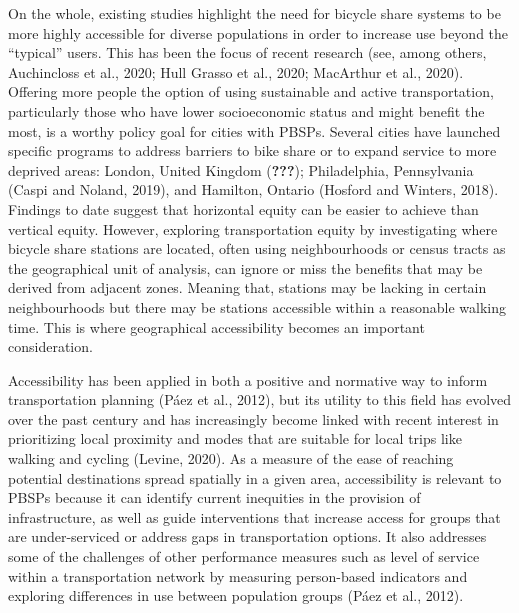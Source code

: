 \documentclass[]{elsarticle} %
\begin{document}
On the whole, existing studies highlight the need for bicycle share
systems to be more highly accessible for diverse populations in order to
increase use beyond the ``typical'' users. This has been the focus of
recent research (see, among others, Auchincloss et al., 2020; Hull
Grasso et al., 2020; MacArthur et al., 2020). Offering more people the
option of using sustainable and active transportation, particularly
those who have lower socioeconomic status and might benefit the most, is
a worthy policy goal for cities with PBSPs. Several cities have launched
specific programs to address barriers to bike share or to expand service
to more deprived areas: London, United Kingdom ({\textbf{???}});
Philadelphia, Pennsylvania (Caspi and Noland, 2019), and Hamilton,
Ontario (Hosford and Winters, 2018). Findings to date suggest that
horizontal equity can be easier to achieve than vertical equity.
However, exploring transportation equity by investigating where bicycle
share stations are located, often using neighbourhoods or census tracts
as the geographical unit of analysis, can ignore or miss the benefits
that may be derived from adjacent zones. Meaning that, stations may be
lacking in certain neighbourhoods but there may be stations accessible
within a reasonable walking time. This is where geographical
accessibility becomes an important consideration.

Accessibility has been applied in both a positive and normative way to
inform transportation planning (Páez et al., 2012), but its utility to
this field has evolved over the past century and has increasingly become
linked with recent interest in prioritizing local proximity and modes
that are suitable for local trips like walking and cycling (Levine,
2020). As a measure of the ease of reaching potential destinations
spread spatially in a given area, accessibility is relevant to PBSPs
because it can identify current inequities in the provision of
infrastructure, as well as guide interventions that increase access for
groups that are under-serviced or address gaps in transportation
options. It also addresses some of the challenges of other performance
measures such as level of service within a transportation network by
measuring person-based indicators and exploring differences in use
between population groups (Páez et al., 2012).
\end{document}
